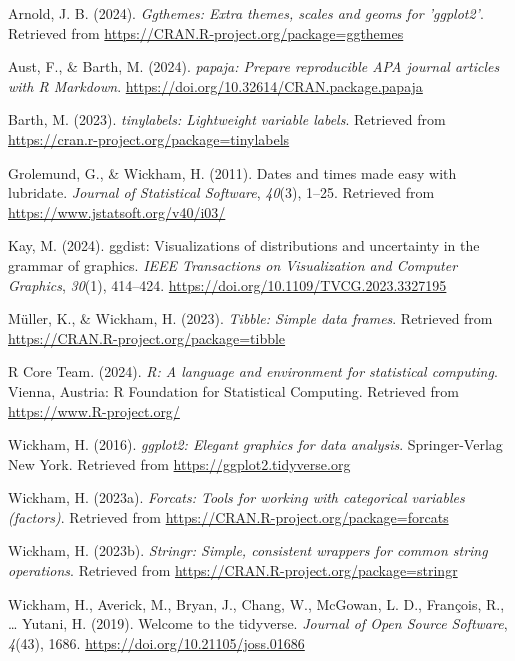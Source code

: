 \documentclass[
  man,floatsintext]{apa6}
\newlength{\cslhangindent}
\newenvironment{CSLReferences}[2] %
 {\begin{list}{}{%
  \setlength{\itemindent}{0pt}
  \setlength{\leftmargin}{0pt}
  \setlength{\parsep}{0pt}
  \ifodd #1
   \setlength{\leftmargin}{\cslhangindent}
   \setlength{\itemindent}{-1\cslhangindent}
  \fi
  \setlength{\itemsep}{#2\baselineskip}}}
 {\end{list}}
\begin{document}
\label{refs}
\begin{CSLReferences}{1}{0}
Arnold, J. B. (2024). \emph{Ggthemes: Extra themes, scales and geoms for 'ggplot2'}. Retrieved from \url{https://CRAN.R-project.org/package=ggthemes}

Aust, F., \& Barth, M. (2024). \emph{{papaja}: {Prepare} reproducible {APA} journal articles with {R Markdown}}. \url{https://doi.org/10.32614/CRAN.package.papaja}

Barth, M. (2023). \emph{{tinylabels}: Lightweight variable labels}. Retrieved from \url{https://cran.r-project.org/package=tinylabels}

Grolemund, G., \& Wickham, H. (2011). Dates and times made easy with {lubridate}. \emph{Journal of Statistical Software}, \emph{40}(3), 1--25. Retrieved from \url{https://www.jstatsoft.org/v40/i03/}

Kay, M. (2024). {ggdist}: Visualizations of distributions and uncertainty in the grammar of graphics. \emph{IEEE Transactions on Visualization and Computer Graphics}, \emph{30}(1), 414--424. \url{https://doi.org/10.1109/TVCG.2023.3327195}

Müller, K., \& Wickham, H. (2023). \emph{Tibble: Simple data frames}. Retrieved from \url{https://CRAN.R-project.org/package=tibble}

R Core Team. (2024). \emph{R: A language and environment for statistical computing}. Vienna, Austria: R Foundation for Statistical Computing. Retrieved from \url{https://www.R-project.org/}

Wickham, H. (2016). \emph{ggplot2: Elegant graphics for data analysis}. Springer-Verlag New York. Retrieved from \url{https://ggplot2.tidyverse.org}

Wickham, H. (2023a). \emph{Forcats: Tools for working with categorical variables (factors)}. Retrieved from \url{https://CRAN.R-project.org/package=forcats}

Wickham, H. (2023b). \emph{Stringr: Simple, consistent wrappers for common string operations}. Retrieved from \url{https://CRAN.R-project.org/package=stringr}

Wickham, H., Averick, M., Bryan, J., Chang, W., McGowan, L. D., François, R., \ldots{} Yutani, H. (2019). Welcome to the {tidyverse}. \emph{Journal of Open Source Software}, \emph{4}(43), 1686. \url{https://doi.org/10.21105/joss.01686}


\end{CSLReferences}
\end{document}
